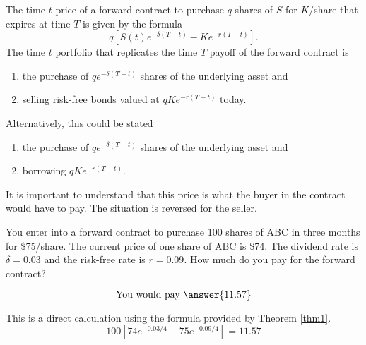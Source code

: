 \documentclass{ximera}
\begin{document}
\begin{theorem}\label{thm1}
The time $t$ price of a forward contract to purchase $q$ shares of $S$ for $K$/share that expires at time $T$ is given by the formula
	\begin{equation*}
	q[S(t)e^{-\delta(T-t)}-Ke^{-r(T-t)}].
	\end{equation*}
The time $t$ portfolio that replicates the time $T$ payoff of the forward contract is
	\begin{enumerate}
	\item the purchase of $qe^{-\delta(T-t)}$ shares of the underlying asset and
	\item selling risk-free bonds valued at $qKe^{-r(T-t)}$ today.
	\end{enumerate}
Alternatively, this could be stated 
	\begin{enumerate}
	\item the purchase of $qe^{-\delta(T-t)}$ shares of the underlying asset and
	\item borrowing $qKe^{-r(T-t)}$. 
	\end{enumerate}
\end{theorem}

\begin{remark}
It is important to understand that this price is what the buyer in the contract would have to pay. The situation is reversed for the seller.
\end{remark}

\begin{question}
You enter into a forward contract to purchase 100 shares of ABC in three months for \$75/share. The current price of one share of ABC is \$74. The dividend rate is $\delta=0.03$ and the risk-free rate is $r=0.09$. How much do you pay for the forward contract?
	\begin{prompt}
		\begin{equation*}
		\text{You would pay }\answer{11.57}
		\end{equation*}
	\end{prompt}
\end{question}

\begin{solution}
	This is a direct calculation using the formula provided by Theorem \ref{thm1}. 
	\begin{equation*}
	100[74e^{-0.03/4}-75e^{-0.09/4}]=11.57
	\end{equation*}
\end{solution}	
\end{document}
